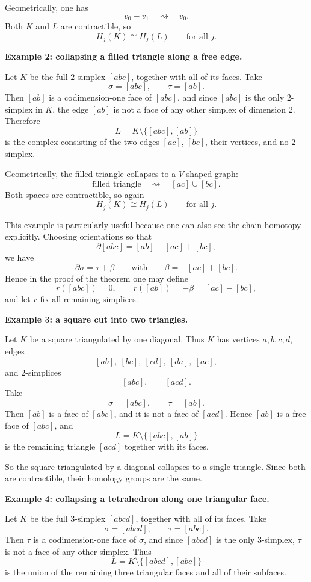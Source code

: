 \documentclass[12pt,a4paper]{article}
\theoremstyle{notespace}
\begin{document}
Geometrically, one has
\[
v_0\!-\!v_1 \quad \rightsquigarrow \quad v_0.
\]
Both \(K\) and \(L\) are contractible, so
\[
H_j(K)\cong H_j(L)
\qquad\text{for all } j.
\]

\medskip

\textbf{Example 2: collapsing a filled triangle along a free edge.}

Let \(K\) be the full \(2\)-simplex \([abc]\), together with all of its faces. Take
\[
\sigma=[abc],\qquad \tau=[ab].
\]
Then \([ab]\) is a codimension-one face of \([abc]\), and since \([abc]\) is the only \(2\)-simplex in \(K\), the edge \([ab]\) is not a face of any other simplex of dimension \(2\). Therefore
\[
L=K\setminus\{[abc],[ab]\}
\]
is the complex consisting of the two edges \([ac]\), \([bc]\), their vertices, and no \(2\)-simplex.

Geometrically, the filled triangle collapses to a \(V\)-shaped graph:
\[
\text{filled triangle} \quad \rightsquigarrow \quad [ac]\cup[bc].
\]
Both spaces are contractible, so again
\[
H_j(K)\cong H_j(L)
\qquad\text{for all } j.
\]

This example is particularly useful because one can also see the chain homotopy explicitly. Choosing orientations so that
\[
\partial[abc]=[ab]-[ac]+[bc],
\]
we have
\[
\partial \sigma = \tau + \beta
\qquad\text{with}\qquad
\beta=-[ac]+[bc].
\]
Hence in the proof of the theorem one may define
\[
r([abc])=0,
\qquad
r([ab])=-\beta=[ac]-[bc],
\]
and let \(r\) fix all remaining simplices.

\medskip

\textbf{Example 3: a square cut into two triangles.}

Let \(K\) be a square triangulated by one diagonal. Thus \(K\) has vertices \(a,b,c,d\), edges
\[
[ab],\ [bc],\ [cd],\ [da],\ [ac],
\]
and \(2\)-simplices
\[
[abc],\qquad [acd].
\]
Take
\[
\sigma=[abc],\qquad \tau=[ab].
\]
Then \([ab]\) is a face of \([abc]\), and it is not a face of \([acd]\). Hence \([ab]\) is a free face of \([abc]\), and
\[
L=K\setminus\{[abc],[ab]\}
\]
is the remaining triangle \([acd]\) together with its faces.

So the square triangulated by a diagonal collapses to a single triangle. Since both are contractible, their homology groups are the same.

\medskip

\textbf{Example 4: collapsing a tetrahedron along one triangular face.}

Let \(K\) be the full \(3\)-simplex \([abcd]\), together with all of its faces. Take
\[
\sigma=[abcd],\qquad \tau=[abc].
\]
Then \(\tau\) is a codimension-one face of \(\sigma\), and since \([abcd]\) is the only \(3\)-simplex, \(\tau\) is not a face of any other simplex. Thus
\[
L=K\setminus\{[abcd],[abc]\}
\]
is the union of the remaining three triangular faces and all of their subfaces.
\end{document}
